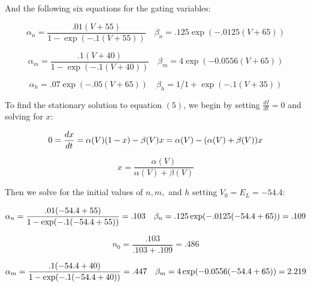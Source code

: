 \documentclass{article}
\begin{document}
And the following six equations for the gating variables:

\begin{equation}
    \alpha_n = \frac{.01(V + 55)}{1 - \exp(-.1(V + 55))} \quad \beta_n = .125 \exp(-.0125(V + 65))
\end{equation}

\begin{equation}
    \alpha_m = \frac{.1(V + 40)}{1 - \exp(-.1(V + 40))} \quad \beta_m = 4 \exp(-0.0556(V + 65))
\end{equation}

\begin{equation}
    \alpha_h = .07 \exp(-.05(V + 65)) \quad \beta_h = 1 / 1 + \exp(-.1(V + 35))
\end{equation}
\vspace{2px}



To find the stationary solution to equation $(5)$, we begin by setting $\frac{dI}{dt} = 0$ and solving for $x$: 

\begin{equation}
    0 = \frac{dx}{dt} \\
    = \alpha(V)(1 - x) - \beta(V)x \\
    = \alpha(V) - (\alpha(V) + \beta(V))x
\end{equation}

\begin{equation}
    x = \frac{\alpha(V)}{\alpha(V) + \beta(V)}
\end{equation}
\vspace{6px}

Then we solve for the initial values of $n, m,$ and $h$ setting $V_0 = E_L = -54.4$:

\vspace{4px}

\begin{equation}
    \alpha_n = \frac{.01(-54.4 + 55)}{1 - \exp(-.1(-54.4 + 55))} = .103 \\ 
    \quad \quad \\
    \beta_n = .125 \exp(-.0125(-54.4 + 65)) = .109
\end{equation}

\begin{equation}
    n_0 = \frac{.103}{.103 + .109} = .486
\end{equation}

\begin{equation}
    \alpha_m = \frac{.1(-54.4 + 40)}{1 - \exp(-.1(-54.4 + 40))} = .447 \\ 
    \quad \quad \\
    \beta_m = 4 \exp(-0.0556(-54.4 + 65)) = 2.219
\end{equation}
\end{document}
